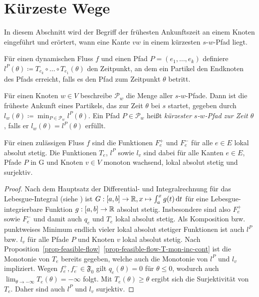 \section{Kürzeste Wege}\label{sec-travel-times}

In diesem Abschnitt wird der Begriff der frühesten Ankunftszeit an einem Knoten eingeführt und erörtert, wann eine Kante $vw$ in einem kürzesten $s$-$w$-Pfad liegt.

\begin{definition}
	Für einen dynamischen Fluss $f$ und einen Pfad $P=(e_1,\dots,e_k)$ definiere $l^P(\theta)\coloneq T_{e_k}\circ\dots\circ T_{e_1}(\theta)$ den Zeitpunkt, an dem ein Partikel den Endknoten des Pfads erreicht, falls es den Pfad zum Zeitpunkt $\theta$ betritt.
	
	Für einen Knoten $w\in V$ beschreibe $\mathcal{P}_w$ die Menge aller $s$-$w$-Pfade.
	Dann ist die früheste Ankunft eines Partikels, das zur Zeit $\theta$ bei $s$ startet, gegeben durch $l_w(\theta)\coloneq \min_{P\in\mathcal{P}_w}l^P(\theta)$.
	Ein Pfad $P\in \mathcal{P}_w$ heißt \emph{kürzester $s$-$w$-Pfad zur Zeit $\theta$}, falls er $l_w(\theta)=l^P(\theta)$ erfüllt.
\end{definition}

\begin{proposition}\label{prop-abs-cont-sur}
	Für einen zulässigen Fluss $f$ sind die Funktionen $F_e^+$ und $F_e^-$ für alle $e\in E$ lokal absolut stetig.
	Die Funktionen $T_e$, $l^P$ sowie $l_v$ sind dabei für alle Kanten $e\in E$, Pfade $P$ in G und Knoten $v\in V$ monoton wachsend, lokal absolut stetig und surjektiv.
\end{proposition}
\begin{proof}
	Nach dem Hauptsatz der Differential- und Integralrechnung für das Lebes\-gue-Inte\-gral (siehe \cite[Kap. VII, Satz 4.14]{Elstrodt2011}) ist $G: [a,b] \to \mathbb{R}, x\mapsto \int_a^x g(t) \mathop{}\!\mathrm{d} t$ für eine Lebesgue-integrierbare Funktion $g: [a,b] \to \mathbb{R}$ absolut stetig.
	Insbesondere sind also $F_e^+$ sowie $F_e^-$ und damit auch $q_e$ und $T_e$ lokal absolut stetig.
	Als Komposition bzw. punktweises Minimum endlich vieler lokal absolut stetiger Funktionen ist auch $l^P$ bzw. $l_v$ für alle Pfade $P$ und Knoten $v$ lokal absolut stetig.
	Nach Proposition~\ref{prop-feasible-flow}~\ref{prop-feasible-flow-T-mon-inc-cont} ist die Monotonie von $T_e$ bereits gegeben, welche auch die Monotonie von $l^P$ und $l_v$ impliziert.
	Wegen $f_e^+, f_e^-\in\mathfrak{F_0}$ gilt $q_e(\theta)=0$ für $\theta\leq 0$, wodurch auch $\lim_{\theta\to-\infty} T_e(\theta) = - \infty$ folgt.
	Mit $T_e(\theta)\geq \theta$ ergibt sich die Surjektivität von $T_e$.
	Daher sind auch $l^P$ und $l_v$ surjektiv.
\end{proof}

